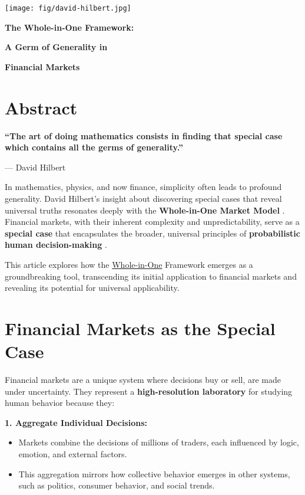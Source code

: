 \documentclass[a4]{article}
\newcommand{\bn}{\bigskip\noindent}
\newcommand{\mn}{\medskip\noindent}
\begin{document}
\begin{center}
\texttt{[image: fig/david-hilbert.jpg]}
\end{center}

\mn
{\huge\bf The Whole-in-One Framework:}

\bn
{\huge\bf A Germ of Generality in}

\bn
{\huge\bf Financial Markets}

\bn
\section*{Abstract}

{\bf ``The art of doing mathematics consists in finding that special case which contains all the germs of generality.''}
  
--- David Hilbert

\bn
In mathematics, physics, and now finance, simplicity often leads to profound generality. David Hilbert's insight about discovering special cases that reveal universal truths resonates deeply with the {\bf Whole-in-One Market Model} . Financial markets, with their inherent complexity and unpredictability, serve as a {\bf special case}  that encapsulates the broader, universal principles of {\bf probabilistic human decision-making} . 

\bn
This article explores how the 
\href{https://blog.quantiota.ai/page/15/the-whole-in-one-framework-financial-market-modeling-with-probabilistic-inputs/}{Whole-in-One} Framework emerges as a groundbreaking tool, transcending its initial application to financial markets and revealing its potential for universal applicability.


\section{Financial Markets as the Special Case}

Financial markets are a unique system where decisions buy or sell, are made under uncertainty. They represent a {\bf high-resolution laboratory}  for studying human behavior because they:

\bn
 {\bf 1. Aggregate Individual Decisions:} 

\begin{itemize}
\item Markets combine the decisions of millions of traders, each influenced by logic, emotion, and external factors.
\item This aggregation mirrors how collective behavior emerges in other systems, such as politics, consumer behavior, and social trends.
\end{itemize}
\end{document}
